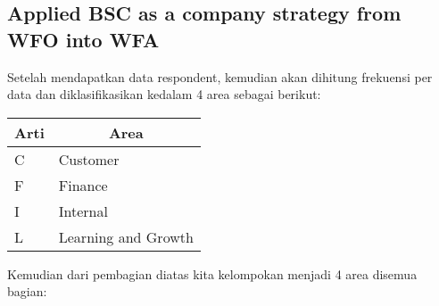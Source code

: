 \documentclass[conference]{IEEEtran}
\begin{document}
\subsection{Applied BSC as a company strategy from WFO into WFA}

Setelah mendapatkan data respondent, kemudian akan dihitung frekuensi per data dan diklasifikasikan kedalam 4 area sebagai berikut:



 \label{tab:title} 

\begin{table}[h]
\center
 \begin{tabular}{|l|l|}
\hline
\multicolumn{1}{|c|}{Arti} & \multicolumn{1}{c|}{Area} \\ \hline
C                          & Customer                  \\ \hline
F                          & Finance                   \\ \hline
I                          & Internal                  \\ \hline
L                          & Learning and Growth       \\ \hline
\end{tabular}

\end{table}



\text Kemudian dari pembagian diatas kita kelompokan menjadi 4 area disemua bagian:


 \label{tab:title} 

\end{document}
